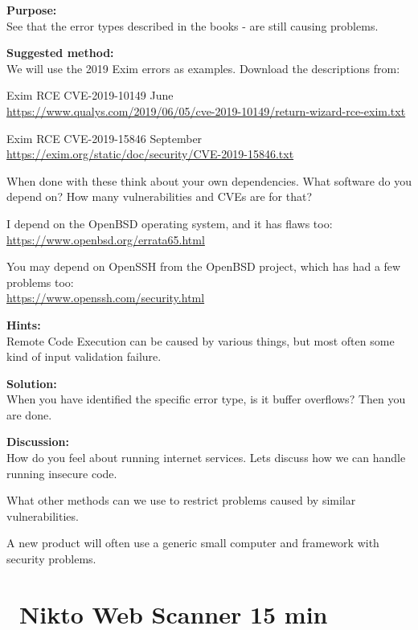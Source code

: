 \documentclass[a4paper,11pt,notitlepage]{report}
\begin{document}
{\bf Purpose:}\\
See that the error types described in the books - are still causing problems.



{\bf Suggested method:}\\
We will use the 2019 Exim errors as examples. Download the descriptions from:
\begin{list2}
\item Exim RCE CVE-2019-10149 June\\ \url{https://www.qualys.com/2019/06/05/cve-2019-10149/return-wizard-rce-exim.txt}

\item Exim RCE CVE-2019-15846 September\\
\url{https://exim.org/static/doc/security/CVE-2019-15846.txt}
\end{list2}

When done with these think about your own dependencies. What software do you depend on? How many vulnerabilities and CVEs are for that?

I depend on the OpenBSD operating system, and it has flaws too:\\
\url{https://www.openbsd.org/errata65.html}

You may depend on OpenSSH from the OpenBSD project, which has had a few problems too:\\
\url{https://www.openssh.com/security.html}

{\bf Hints:}\\
Remote Code Execution can be caused by various things, but most often some kind of input validation failure.

{\bf Solution:}\\
When you have identified the specific error type, is it buffer overflows? Then you are done.

{\bf Discussion:}\\
How do you feel about running internet services. Lets discuss how we can handle running insecure code.

What other methods can we use to restrict problems caused by similar vulnerabilities.

A new product will often use a generic small computer and framework with security problems.

\chapter{\faInfoCircle\ Nikto Web Scanner 15 min}
\label{ex:nikto-webscanner}
\end{document}
